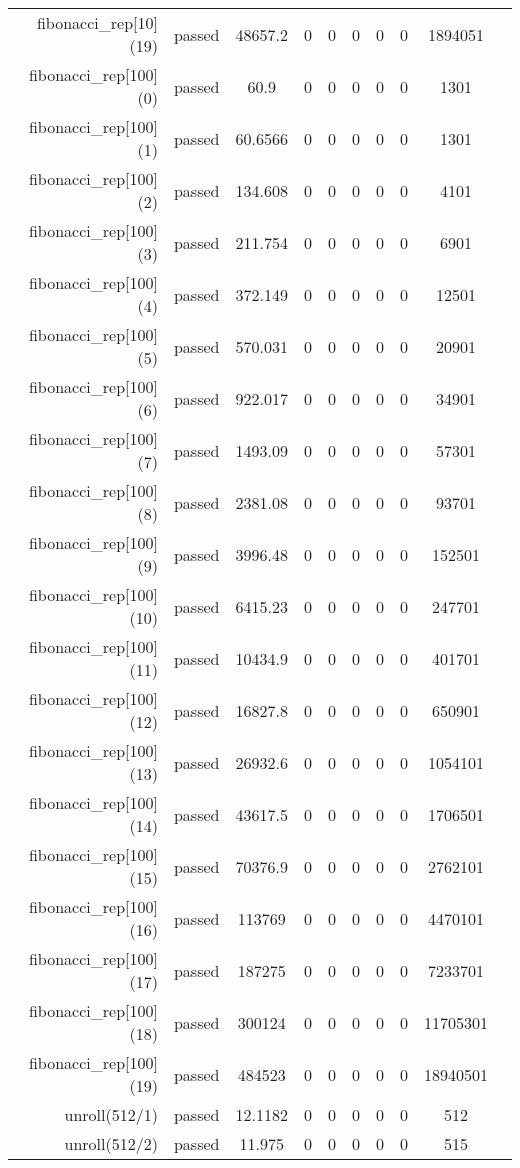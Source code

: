 \begin{longtable}{r|ccccccccc}
    fibonacci\_rep[10](19) & passed & 48657.2 & 0 & 0 & 0 & 0 & 0 & 1894051 \\
    fibonacci\_rep[100](0) & passed & 60.9 & 0 & 0 & 0 & 0 & 0 & 1301 \\
    fibonacci\_rep[100](1) & passed & 60.6566 & 0 & 0 & 0 & 0 & 0 & 1301 \\
    fibonacci\_rep[100](2) & passed & 134.608 & 0 & 0 & 0 & 0 & 0 & 4101 \\
    fibonacci\_rep[100](3) & passed & 211.754 & 0 & 0 & 0 & 0 & 0 & 6901 \\
    fibonacci\_rep[100](4) & passed & 372.149 & 0 & 0 & 0 & 0 & 0 & 12501 \\
    fibonacci\_rep[100](5) & passed & 570.031 & 0 & 0 & 0 & 0 & 0 & 20901 \\
    fibonacci\_rep[100](6) & passed & 922.017 & 0 & 0 & 0 & 0 & 0 & 34901 \\
    fibonacci\_rep[100](7) & passed & 1493.09 & 0 & 0 & 0 & 0 & 0 & 57301 \\
    fibonacci\_rep[100](8) & passed & 2381.08 & 0 & 0 & 0 & 0 & 0 & 93701 \\
    fibonacci\_rep[100](9) & passed & 3996.48 & 0 & 0 & 0 & 0 & 0 & 152501 \\
    fibonacci\_rep[100](10) & passed & 6415.23 & 0 & 0 & 0 & 0 & 0 & 247701 \\
    fibonacci\_rep[100](11) & passed & 10434.9 & 0 & 0 & 0 & 0 & 0 & 401701 \\
    fibonacci\_rep[100](12) & passed & 16827.8 & 0 & 0 & 0 & 0 & 0 & 650901 \\
    fibonacci\_rep[100](13) & passed & 26932.6 & 0 & 0 & 0 & 0 & 0 & 1054101 \\
    fibonacci\_rep[100](14) & passed & 43617.5 & 0 & 0 & 0 & 0 & 0 & 1706501 \\
    fibonacci\_rep[100](15) & passed & 70376.9 & 0 & 0 & 0 & 0 & 0 & 2762101 \\
    fibonacci\_rep[100](16) & passed & 113769 & 0 & 0 & 0 & 0 & 0 & 4470101 \\
    fibonacci\_rep[100](17) & passed & 187275 & 0 & 0 & 0 & 0 & 0 & 7233701 \\
    fibonacci\_rep[100](18) & passed & 300124 & 0 & 0 & 0 & 0 & 0 & 11705301 \\
    fibonacci\_rep[100](19) & passed & 484523 & 0 & 0 & 0 & 0 & 0 & 18940501 \\
    unroll(512/1) & passed & 12.1182 & 0 & 0 & 0 & 0 & 0 & 512 \\
    unroll(512/2) & passed & 11.975 & 0 & 0 & 0 & 0 & 0 & 515 \\

\end{longtable}

